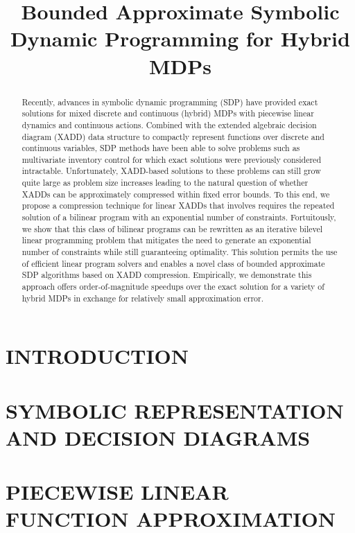 \documentclass[]{article}
\title{	Bounded Approximate Symbolic Dynamic Programming for Hybrid MDPs }
\begin{document}
\maketitle

\begin{abstract}
Recently, advances in symbolic dynamic programming (SDP) have provided exact solutions for mixed discrete and continuous (hybrid) MDPs with piecewise linear dynamics and continuous actions. Combined with the extended algebraic decision diagram (XADD) data structure to compactly represent functions over discrete and continuous variables, SDP methods have been able to solve problems such as multivariate inventory control for which exact solutions were previously considered intractable. Unfortunately, XADD-based solutions to these problems can still grow quite large as problem size increases leading to the natural question of whether XADDs can be approximately compressed within fixed error bounds. To this end, we propose a compression technique for linear XADDs that involves requires the repeated solution of a bilinear program with an exponential number of constraints. Fortuitously, we show that this class of bilinear programs can be rewritten as an iterative bilevel linear programming problem that mitigates the need to generate an exponential number of constraints while still guaranteeing optimality. This solution permits the use of efficient linear program solvers and enables a novel class of bounded approximate SDP algorithms based on XADD compression. Empirically, we demonstrate this approach offers order-of-magnitude speedups over the exact solution for a variety of hybrid MDPs in exchange for relatively small approximation error.
\end{abstract}

\section{INTRODUCTION}



\section{SYMBOLIC REPRESENTATION AND DECISION DIAGRAMS}



\section{PIECEWISE LINEAR FUNCTION APPROXIMATION}
\end{document}
